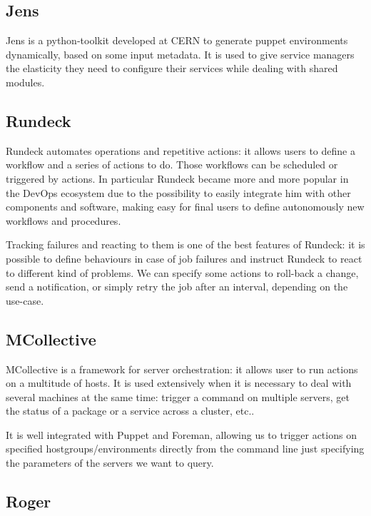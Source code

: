 \subsection{Jens}

Jens is a python-toolkit developed at CERN to generate puppet environments
dynamically, based on some input metadata. It is used to give service
managers the elasticity they need to configure their services while
dealing with shared modules.


\subsection{Rundeck}

Rundeck automates operations and repetitive actions: it allows users to
define a workflow and a series of actions to do. Those workflows can be
scheduled or triggered by actions. In particular Rundeck became more and
more popular in the DevOps ecosystem due to the possibility to easily
integrate him with other components and software, making easy for final
users to define autonomously new workflows and procedures.

Tracking failures and reacting to them is one of the best features of
Rundeck: it is possible to define behaviours in case of job failures and
instruct Rundeck to react to different kind of problems. We can specify
some actions to roll-back a change, send a notification, or simply retry
the job after an interval, depending on the use-case. 

\subsection{MCollective}

MCollective is a framework for server orchestration: it allows user to run
actions on a multitude of hosts. It is used extensively when it is
necessary to deal with several machines at the same time: trigger
a command on multiple servers, get the status of a package or a service
across a cluster, etc..

It is well integrated with Puppet and Foreman, allowing us to trigger
actions on specified hostgroups/environments directly from the command
line just specifying the parameters of the servers we want to query.

\subsection{Roger}

